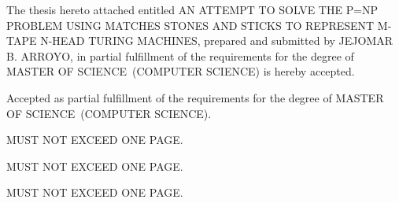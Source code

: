 \documentclass{icsthesis}
\renewcommand{\TITLE}{AN ATTEMPT TO SOLVE THE P=NP PROBLEM USING MATCHES STONES AND STICKS TO REPRESENT M-TAPE N-HEAD TURING MACHINES}
\renewcommand{\AUTHOR}{JEJOMAR B. ARROYO}
\renewcommand{\DEGREE}{MASTER OF SCIENCE}
\renewcommand{\MAJOR}{COMPUTER SCIENCE}
\begin{document}
	
	\begin{frontmatter}
		\maketitle
				
		\begin{approvalpage}
			The thesis hereto attached entitled \TITLE , prepared and submitted by \AUTHOR , in partial fulfillment of the requirements for the degree of \DEGREE\ (\MAJOR) is hereby accepted.
			
			\begin{multicols}{2}
				\centering
				\columnbreak
			\end{multicols}
			
			Accepted as partial fulfillment of the requirements for the degree of \DEGREE\ (\MAJOR). 
		\end{approvalpage}
		
		\begin{biosketch}
			\lipsum[4] %
			
			MUST NOT EXCEED ONE PAGE.		
			
			\addauthorsignaturefield
		\end{biosketch}	
		
		\begin{acknowledgement}
			\lipsum[4]
			\lipsum[4]
			\lipsum[4]
			MUST NOT EXCEED ONE PAGE.
		\end{acknowledgement}
		
		\maketableofcontents
		
		\makelistoftables

		\makelistoffigures
	
		\begin{abstractwithpageno}
			\lipsum[4]MUST NOT EXCEED ONE PAGE.
		\end{abstractwithpageno}

	\end{frontmatter}
	
\end{document}
